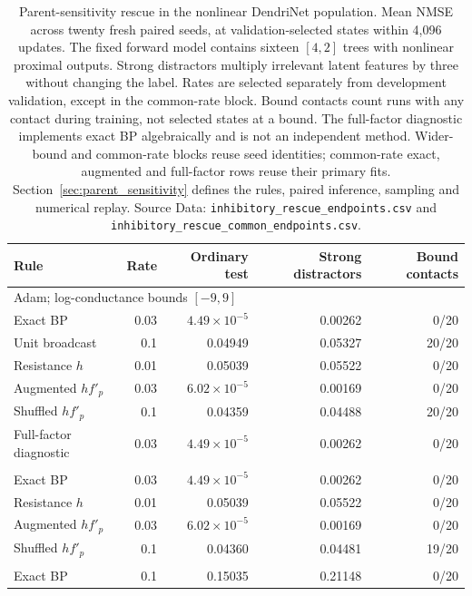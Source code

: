 \begin{table}[!htbp]
\centering
\caption{Parent-sensitivity rescue in the nonlinear DendriNet population.
Mean NMSE across twenty fresh paired seeds, at validation-selected states
within 4,096 updates. The fixed forward model contains sixteen $[4,2]$ trees
with nonlinear proximal outputs. Strong distractors multiply irrelevant
latent features by three without changing the label. Rates are selected
separately from development validation, except in the common-rate block.
Bound contacts count runs with any contact during training, not selected
states at a bound. The full-factor diagnostic implements exact BP
algebraically and is not an independent method. Wider-bound and common-rate
blocks reuse seed identities; common-rate exact, augmented and full-factor
rows reuse their primary fits. Section~\ref{sec:parent_sensitivity} defines
the rules, paired inference, sampling and numerical replay.
Source Data: \texttt{inhibitory\_rescue\_endpoints.csv} and
\texttt{inhibitory\_rescue\_common\_endpoints.csv}.}
\label{tab:parent_sensitivity}
\footnotesize
\begin{tabular}{lrrrr}
\toprule
Rule & Rate & Ordinary test & Strong distractors & Bound contacts \\
\midrule
\multicolumn{5}{l}{Adam; log-conductance bounds $[-9,9]$} \\
Exact BP & 0.03 & $4.49\times10^{-5}$ & 0.00262 & 0/20 \\
Unit broadcast & 0.1 & 0.04949 & 0.05327 & 20/20 \\
Resistance $h$ & 0.01 & 0.05039 & 0.05522 & 0/20 \\
Augmented $h f'_p$ & 0.03 & $6.02\times10^{-5}$ & 0.00169 & 0/20 \\
Shuffled $h f'_p$ & 0.1 & 0.04359 & 0.04488 & 20/20 \\
Full-factor diagnostic & 0.03 & $4.49\times10^{-5}$ & 0.00262 & 0/20 \\
\addlinespace
\multicolumn{5}{l}{Adam; wider bounds $[-12,12]$} \\
Exact BP & 0.03 & $4.49\times10^{-5}$ & 0.00262 & 0/20 \\
Resistance $h$ & 0.01 & 0.05039 & 0.05522 & 0/20 \\
Augmented $h f'_p$ & 0.03 & $6.02\times10^{-5}$ & 0.00169 & 0/20 \\
Shuffled $h f'_p$ & 0.1 & 0.04360 & 0.04481 & 19/20 \\
\addlinespace
\multicolumn{5}{l}{SGD; bounds $[-9,9]$} \\
Exact BP & 0.1 & 0.15035 & 0.21148 & 0/20 \\

\end{tabular}
\end{table}
